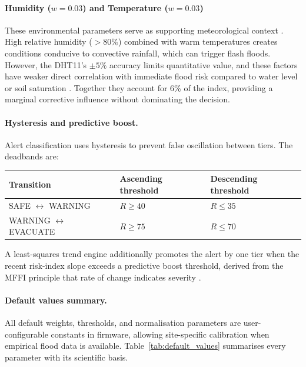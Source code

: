 \documentclass[5p,twocolumn]{elsarticle}
\begin{document}
\paragraph{Humidity ($w = 0.03$) and Temperature ($w = 0.03$)} These environmental parameters serve as supporting meteorological context \cite{tao2024}. High relative humidity ($>80\%$) combined with warm temperatures creates conditions conducive to convective rainfall, which can trigger flash floods. However, the DHT11's $\pm5\%$ accuracy \cite{dht11} limits quantitative value, and these factors have weaker direct correlation with immediate flood risk compared to water level or soil saturation \cite{mdegela2023}. Together they account for 6\% of the index, providing a marginal corrective influence without dominating the decision.

\paragraph{Hysteresis and predictive boost.} Alert classification uses hysteresis to prevent false oscillation between tiers. The deadbands are:

\medskip
\noindent
\begin{minipage}{\columnwidth}
\centering
\scriptsize
\setlength{\tabcolsep}{3pt}
\begin{tabular}{|L{2.5cm}|C{2.5cm}|C{2.5cm}|}
  \hline
  \textbf{Transition} & \textbf{Ascending threshold} & \textbf{Descending threshold} \\ \hline
  SAFE $\leftrightarrow$ WARNING & $R \ge 40$ & $R \le 35$ \\ \hline
  WARNING $\leftrightarrow$ EVACUATE & $R \ge 75$ & $R \le 70$ \\ \hline
\end{tabular}
\label{tab:hysteresis}
\end{minipage}
\medskip

A least-squares trend engine additionally promotes the alert by one tier when the recent risk-index slope exceeds a predictive boost threshold, derived from the MFFI principle that rate of change indicates severity \cite{kim2014,guo2026}.

\paragraph{Default values summary.} All default weights, thresholds, and normalisation parameters are user-configurable constants in firmware, allowing site-specific calibration when empirical flood data is available. Table~\ref{tab:default_values} summarises every parameter with its scientific basis.
\end{document}
